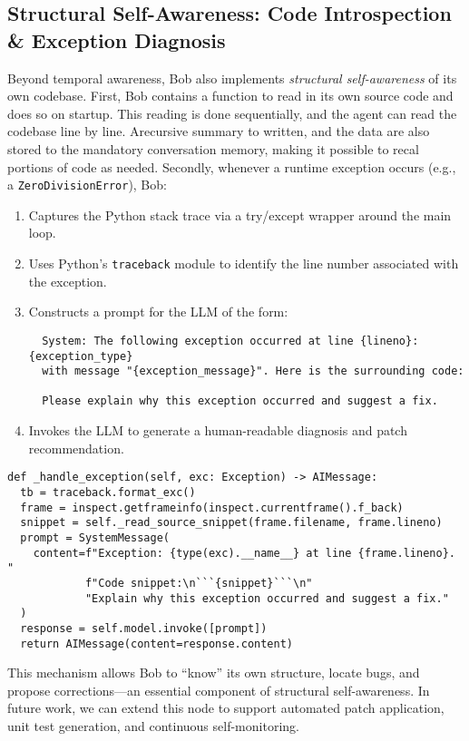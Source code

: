 \documentclass[11pt]{article}
\begin{document}
\subsection{Structural Self-Awareness: Code Introspection \& Exception Diagnosis}
Beyond temporal awareness, Bob also implements \emph{structural self-awareness} of its own codebase. 
First, Bob contains a function to read in its own source code and does so on startup.
This reading is done sequentially, and the agent can read the codebase line by line.  Arecursive summary to written, and the data are also stored to the mandatory conversation memory, making it possible to recal portions of code as needed.  Secondly, whenever a runtime exception occurs (e.g., a \texttt{ZeroDivisionError}), Bob:
\begin{enumerate}[leftmargin=*]
  \item Captures the Python stack trace via a try/except wrapper around the main loop.
  \item Uses Python’s \texttt{traceback} module to identify the line number associated with the exception.
  \item Constructs a prompt for the LLM of the form:
  \begin{verbatim} 
  System: The following exception occurred at line {lineno}: {exception_type}
  with message "{exception_message}". Here is the surrounding code:

  Please explain why this exception occurred and suggest a fix.
\end{verbatim}
\item Invokes the LLM to generate a human-readable diagnosis and patch recommendation.
\end{enumerate}

\begin{verbatim}
def _handle_exception(self, exc: Exception) -> AIMessage:
  tb = traceback.format_exc()
  frame = inspect.getframeinfo(inspect.currentframe().f_back)
  snippet = self._read_source_snippet(frame.filename, frame.lineno)
  prompt = SystemMessage(
    content=f"Exception: {type(exc).__name__} at line {frame.lineno}. "
            f"Code snippet:\n```{snippet}```\n"
            "Explain why this exception occurred and suggest a fix."
  )
  response = self.model.invoke([prompt])
  return AIMessage(content=response.content)
\end{verbatim}

This mechanism allows Bob to “know” its own structure, locate bugs, and propose corrections—an essential component of structural self-awareness. In future work, we can extend this node to support automated patch application, unit test generation, and continuous self-monitoring.
\end{document}
